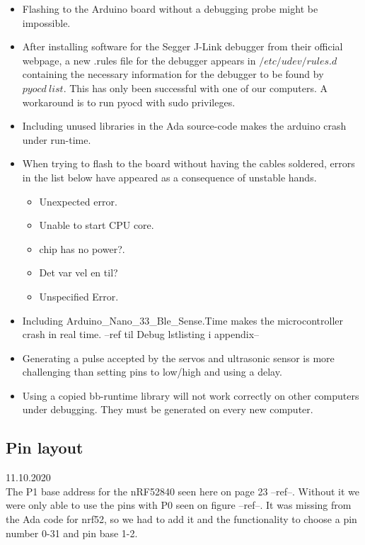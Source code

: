 \documentclass{article}
\begin{document}
\begin{itemize}
	\item Flashing to the Arduino board without a debugging probe might be impossible.

	\item After installing software for the Segger J-Link debugger from their official webpage, a new .rules file for the debugger appears in $/etc/udev/rules.d$ containing the necessary information for the debugger to be found by $pyocd\ list$. This has only been successful with one of our computers. A workaround is to run pyocd with sudo privileges.

	\item Including unused libraries in the Ada source-code makes the arduino crash under run-time.

	\item When trying to flash to the board without having the cables soldered, errors in the list below have appeared as a consequence of unstable hands.
		\begin{itemize}
			\item Unexpected error.
			\item Unable to start CPU core.
			\item chip has no power?.
			\item Det var vel en til?
            \item Unspecified Error.
		\end{itemize}

	\item Including Arduino\_Nano\_33\_Ble\_Sense.Time makes the microcontroller crash in real time. --ref til Debug lstlisting i appendix--

	\item Generating a pulse accepted by the servos and ultrasonic sensor is more challenging than setting pins to low/high and using a delay.

	\item Using a copied bb-runtime library will not work correctly on other computers under debugging. They must be generated on every new computer.

\end{itemize}

\subsection{Pin layout}
11.10.2020\\
The P1 base address for the nRF52840 seen here on page 23 --ref--. Without it we were only able to use the pins with P0 seen on figure --ref--. It was missing from the Ada code for nrf52, so we had to add it and the functionality to choose a pin number 0-31 and pin base 1-2.
\end{document}
